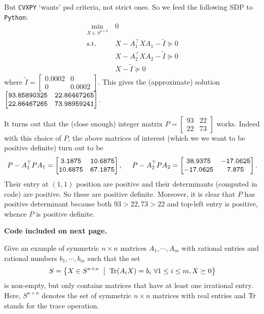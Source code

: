 \begin{enumerate}[leftmargin=*]
But \texttt{CVXPY} `wants' psd criteria, not strict ones. So we feed the following SDP to \texttt{Python}:\begin{align*}
\min_{X\in S^{2\times 2}} &~ 0\\
\text{s.t.}&~ X - A_{1}^{\top} X  A_{1} - \tilde I\succeq 0\\
&~ X - A_{2}^{\top} X  A_{2} - \tilde I\succeq 0\\
&~ X - \tilde I\succeq 0
\end{align*} where $\tilde I=\begin{bmatrix}0.0002&0\\0&0.0002\end{bmatrix}$. This gives the (approximate) solution $\begin{bmatrix}\tt93.85890325 &\tt22.86467265\\ \tt22.86467265 & \tt73.98959241\end{bmatrix}$. 




It turns out that the (close enough) integer matrix $P = \begin{bmatrix}93 &22\\ 22 & 73\end{bmatrix}$ works. Indeed with this choice of $P$, the above matrices of interest (which we we want to be positive definite) turn out to be $$P-A_{1}^{\top}PA_{1} = \begin{bmatrix}\tt3.1875 &\tt10.6875\\\tt10.6875 &\tt67.1875\end{bmatrix}, ~~~~P-A_{2}^{\top}PA_{2} = \begin{bmatrix}\tt38.9375 &\tt-17.0625\\\tt-17.0625   &\tt7.875 \end{bmatrix}.$$ Their entry at $(1,1)$ position are positive and their determinants (computed in code) are positive. So these are positive definite. Moreover, it is clear that $P$ has positive determinant because both $93>22, 73>22$ and top-left entry is positive, whence $P$ is positive definite. 

\textbf{Code included on next page.}


{}

\end{enumerate}


\newpage
\pb
Give an example of symmetric $n \times n$ matrices $A_{1}, \cdots , A_{m}$ with rational entries and rational numbers $b_{1},\cdots,b_{m}$ such that the set 
$$S = \set{X\in S^{n\times n}\st\Tr(A_{i}X) = b_{i}~\forall 1\le i\le m, X\succeq 0}$$ is non-empty, but only contains matrices that have at least one irrational entry. Here, $S^{n\times n}$ denotes the set of symmetric $n \times n$ matrices with real entries and $\operatorname{Tr}$ stands for the trace operation.

